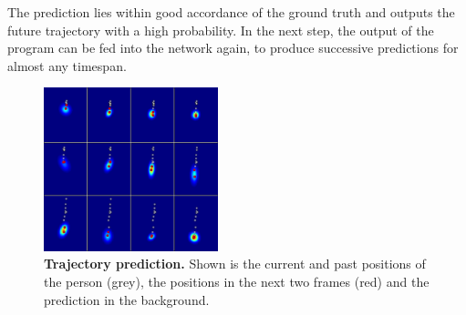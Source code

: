 The prediction lies within good accordance of the ground truth and outputs the future trajectory with a high probability. In the next step, the output of the program can be fed into the network again, to produce successive predictions for almost any timespan.

\begin{figure}
	\normalsize
	\begin{center}
		 \includegraphics[width=0.45\textwidth]{figures/trajectory_pred.png}
	\end{center}
	\caption{\textbf{Trajectory prediction.} Shown is the current and past positions of the person (grey), the positions in the next two frames (red) and the prediction in the background.}
	\label{fig:trajectory_pred}
\end{figure}
